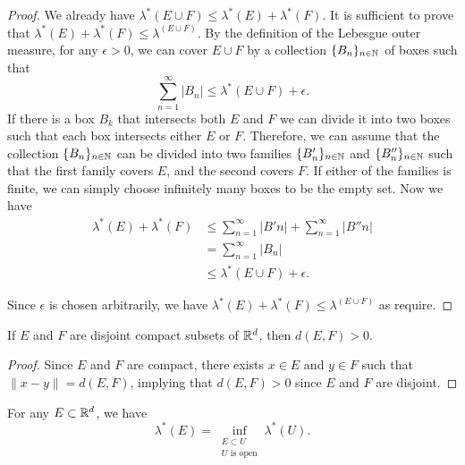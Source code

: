 \begin{proof}
  We already have $\lambda^*(E\cup F) \le \lambda^*(E) + \lambda^*(F)$. It is sufficient to prove that $\lambda^*(E) + \lambda^*(F) \le \lambda^(E\cup F)$. By the definition of the Lebesgue outer measure, for any $\epsilon>0$, we can cover $E\cup F$ by a collection $\{B_n\}_{n\in\mathbb{N}}$ of boxes such that
  $$\sum\limits_{n=1}^\infty |B_n| \le \lambda^*(E\cup F) + \epsilon.$$
  If there is a box $B_k$ that intersects both $E$ and $F$ we can divide it into two boxes such that each box intersects either $E$ or $F$. Therefore, we can assume that the collection $\{B_n\}_{n\in\mathbb{N}}$ can be divided into two families $\{B'_n\}_{n\in\mathbb{N}}$ and $\{B''_n\}_{n\in\mathbb{N}}$ such that the first family covers $E$, and the second covers $F$. If either of the families is finite, we can simply choose infinitely many boxes to be the empty set. Now we have
  \begin{align*}
    \lambda^*(E) + \lambda^*(F)
     & \le \sum\limits_{n=1}^\infty |B'n| +  \sum\limits_{n=1}^\infty |B''n| \\
     & = \sum\limits_{n=1}^\infty |B_n|                                      \\
     & \le \lambda^*(E\cup F) + \epsilon.
  \end{align*}

  Since $\epsilon$ is chosen arbitrarily, we have $\lambda^*(E) + \lambda^*(F) \le \lambda^(E\cup F)$ as require.
\end{proof}

\begin{lemma}
  \label{lemma:disjoint-compact-sets}
  If $E$ and $F$ are disjoint compact subsets of $\mathbb{R}^d$, then $d(E,F) > 0$.
\end{lemma}

\begin{proof}
  Since $E$ and $F$ are compact, there exists $x\in E$ and $y\in F$ such that $\|x-y\| = d(E,F)$, implying that $d(E,F) > 0$ since $E$ and $F$ are disjoint.
\end{proof}

\begin{lemma}
  \label{lemma:outer-regularity}
  For any $E\subset\mathbb{R}^d$, we have
  \begin{equation}
    \lambda^*(E) = \inf\limits_{\substack{E \subset U \\ U \text{ is open}}} \lambda^*(U).
  \end{equation}
\end{lemma}

